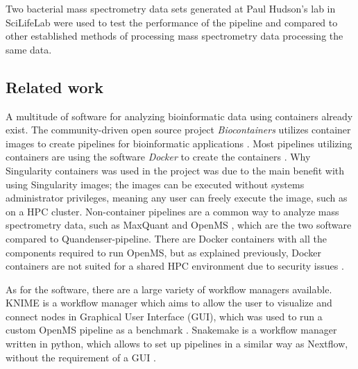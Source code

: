 Two bacterial mass spectrometry data sets generated at Paul Hudson's lab in SciLifeLab were used to test the performance of the pipeline and compared to other established methods of processing mass spectrometry data processing the same data.

\subsection{Related work}
A multitude of software for analyzing bioinformatic data using containers already exist. The community-driven open source project \textit{Biocontainers} utilizes container images to create pipelines for bioinformatic applications \cite{biocontainers}. Most pipelines utilizing containers are using the software \textit{Docker} to create the containers \cite{docker}. Why Singularity containers was used in the project was due to the main benefit with using Singularity images; the images can be executed without systems administrator privileges, meaning any user can freely execute the image, such as on a HPC cluster. Non-container pipelines are a common way to analyze mass spectrometry data, such as MaxQuant and OpenMS \cite{maxquant} \cite{openms}, which are the two software compared to Quandenser-pipeline. There are Docker containers with all the components required to run OpenMS, but as explained previously, Docker containers are not suited for a shared HPC environment due to security issues \cite{openms-hpc}.

As for the software, there are a large variety of workflow managers available. KNIME is a workflow manager which aims to allow the user to visualize and connect nodes in Graphical User Interface (GUI), which was used to run a custom OpenMS pipeline as a benchmark \cite{knime}. Snakemake is a workflow manager written in python, which allows to set up pipelines in a similar way as Nextflow, without the requirement of a GUI \cite{snakemake}.

